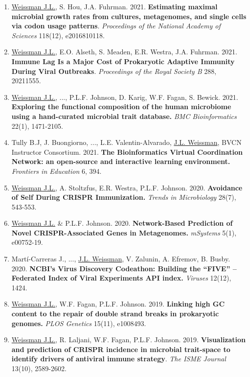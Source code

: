 \documentclass[]{res}
\begin{document}
\begin{resume}
\begin{enumerate}[leftmargin=*]
\item \underline{Weissman J.L.}, S. Hou, J.A. Fuhrman. 2021. {\bf Estimating maximal microbial growth rates from cultures, metagenomes, and single cells via codon usage patterns}. \emph{Proceedings of the National Academy of Sciences} 118(12), e2016810118. 
 
\item \underline{Weissman J.L.}, E.O. Alseth, S. Meaden, E.R. Westra, J.A. Fuhrman. 2021. {\bf Immune Lag Is a Major Cost of Prokaryotic Adaptive Immunity During Viral Outbreaks}. \emph{Proceedings of the Royal Society B} 288, 20211555.

\item \underline{Weissman J.L.}, ..., P.L.F. Johnson, D. Karig, W.F. Fagan, S. Bewick. 2021. {\bf Exploring the functional composition of the human microbiome using a hand-curated microbial trait database.} \emph{BMC Bioinformatics} 22(1), 1471-2105.

\item Tully B.J, J. Buongiorno, ..., L.E. Valentin-Alvarado, \underline{J.L. Weissman}, BVCN Instructor Consortium. 2021. {\bf The Bioinformatics Virtual Coordination Network: an open-source and interactive learning environment.} \emph{Frontiers in Education} 6, 394.

\item \underline{Weissman J.L.}, A. Stoltzfus, E.R. Westra, P.L.F. Johnson. 2020. {\bf Avoidance of Self During CRISPR Immunization.} \emph{Trends in Microbiology} 28(7), 543-553.

\item \underline{Weissman J.L.} \& P.L.F. Johnson. 2020. {\bf Network-Based Prediction of Novel CRISPR-Associated Genes in Metagenomes.} \emph{mSystems} 5(1), e00752-19.

\item Mart\'{i}-Carreras J., ..., \underline{J.L. Weissman}, V. Zalunin, A. Efremov, B. Busby. 2020. {\bf NCBI’s Virus Discovery Codeathon: Building the “FIVE” -- Federated Index of Viral Experiments API index.} \emph{Viruses} 12(12), 1424.
 
 \item \underline{Weissman J.L.}, W.F. Fagan, P.L.F. Johnson. 2019. {\bf Linking high GC content to the repair of double strand breaks in prokaryotic genomes.} \emph{PLOS Genetics} 15(11), e1008493.\\ %
 
 \item \underline{Weissman J.L.}, R. Laljani, W.F. Fagan, P.L.F. Johnson. 2019. {\bf Visualization and prediction of CRISPR incidence in microbial trait-space to identify drivers of antiviral immune strategy}. \emph{The ISME Journal} 13(10), 2589-2602. %
 

\end{enumerate}
\end{resume}
\end{document}
